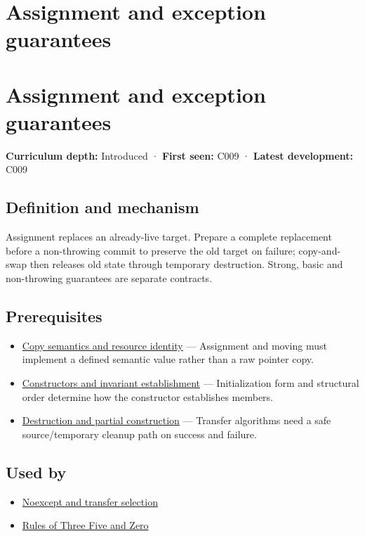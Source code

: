 \hypertarget{appendix-bea6beb5350f}{}
\section*{Assignment and exception guarantees}
\section{Assignment and exception guarantees}\label{assignment-and-exception-guarantees}

\textbf{Curriculum depth:} Introduced · \textbf{First seen:} C009 · \textbf{Latest development:} C009

\subsection{Definition and mechanism}\label{definition-and-mechanism}

Assignment replaces an already-live target. Prepare a complete replacement before a non-throwing commit to preserve the old target on failure; copy-and-swap then releases old state through temporary destruction. Strong, basic and non-throwing guarantees are separate contracts.

\subsection{Prerequisites}\label{prerequisites}

\begin{itemize}
\tightlist
\item
  \hyperref[appendix-1340cd1ce582]{Copy semantics and resource identity} --- Assignment and moving must implement a defined semantic value rather than a raw pointer copy.
\item
  \hyperref[appendix-7f8ec83d0886]{Constructors and invariant establishment} --- Initialization form and structural order determine how the constructor establishes members.
\item
  \hyperref[appendix-9bfe377cef7a]{Destruction and partial construction} --- Transfer algorithms need a safe source/temporary cleanup path on success and failure.
\end{itemize}

\subsection{Used by}\label{used-by}

\begin{itemize}
\tightlist
\item
  \hyperref[appendix-c746afaa47d1]{Noexcept and transfer selection}
\item
  \hyperref[appendix-7679107d057e]{Rules of Three Five and Zero}
\end{itemize}


